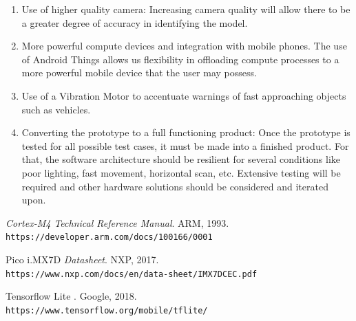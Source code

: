 \documentclass[a4paper,conference]{IEEEtran}
\begin{document}
	\begin{enumerate}
	\item Use of higher quality camera: Increasing camera quality will allow there to be a greater degree of accuracy in identifying the model.
	\item More powerful compute devices and integration with mobile phones. The use of Android Things allows us flexibility in offloading compute processes to a more powerful mobile device that the user may possess.
	\item Use of a Vibration Motor to accentuate warnings of fast approaching objects such as vehicles.
	\item Converting the prototype to a full functioning product: Once the prototype is tested for all possible test cases, it must be made into a finished product. For that, the software architecture should be resilient for several conditions like poor lighting, fast movement, horizontal scan, etc. Extensive testing will be required and other hardware solutions should be considered and iterated upon.
	\end{enumerate} 
	
	\begin{thebibliography}{9}
		
		\textit{Cortex-M4 Technical Reference Manual}. 
		ARM, 1993.
		\\\texttt{https://developer.arm.com/docs/100166/0001}
		 
		Pico i.MX7D 
		\textit{Datasheet}. 
		NXP, 2017.
		\\\texttt{https://www.nxp.com/docs/en/data-sheet/IMX7DCEC.pdf}

		Tensorflow Lite
		\textit{}. 
		Google, 2018.
		\\\texttt{https://www.tensorflow.org/mobile/tflite/}
		\end{thebibliography}
	
	
\end{document}
